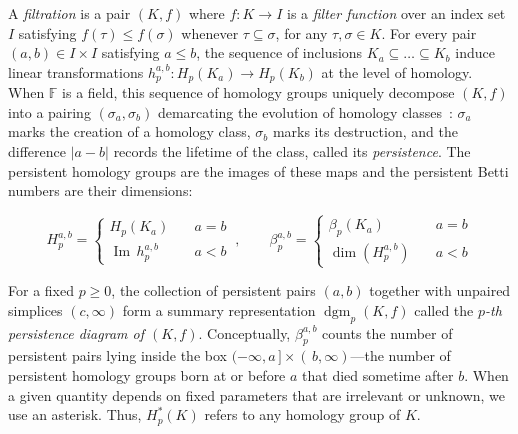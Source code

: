 \documentclass[pdflatex,sn-mathphys-num]{sn-jnl}
\begin{document}
A \emph{filtration} is a pair \((K,f)\) where \(f:K \rightarrow I\) is a \emph{filter function} over an index set \(I\) satisfying \(f(\tau) \leq f(\sigma)\) whenever \(\tau \subseteq \sigma\), for any \(\tau,\sigma \in K\). For every pair \((a,b) \in I \times I\) satisfying \(a \leq b\), the sequence of inclusions \(K_{a} \subseteq \ldots \subseteq K_{b}\) induce linear transformations \(h_{p}^{a,b}:H_{p}\left( K_{a} \right) \rightarrow H_{p}\left( K_{b} \right)\) at the level of homology. When \(\mathbb{F}\) is a field, this sequence of homology groups uniquely decompose \((K,f)\) into a pairing \(\left( \sigma_{a},\sigma_{b} \right)\) demarcating the evolution of homology classes~\cite{zomorodian2004computing}: \(\sigma_{a}\) marks the creation of a homology class, \(\sigma_{b}\) marks its destruction, and the difference \(\left| {a - b} \right|\) records the lifetime of the class, called its \emph{persistence}. The persistent homology groups are the images of these maps and the persistent Betti numbers are their dimensions:

\[H_{p}^{a,b} = \begin{cases}
H_{p}\left( K_{a} \right) & \quad a = b \\
\operatorname{Im}\, h_{p}^{a,b} & \quad a < b
\end{cases}\:,\quad\quad\beta_{p}^{a,b} = \begin{cases}
\beta_{p}\left( K_{a} \right) & \quad a = b \\
\dim \left( H_{p}^{a,b} \right)  & \quad a < b
\end{cases}\]\protect{}\label{eq:pers_homology}{}

For a fixed \(p \geq 0\), the collection of persistent pairs \((a,b)\) together with unpaired simplices \((c,\infty)\) form a summary representation \(\operatorname{dgm}_{p}(K,f)\) called the \emph{\(p\)-th persistence diagram of \((K,f)\)}. Conceptually, \(\beta_{p}^{a,b}\) counts the number of persistent pairs lying inside the box \(( - \infty,a\,] \times (\, b,\infty)\)---the number of persistent homology groups born at or before \(a\) that died sometime after \(b\). When a given quantity depends on fixed parameters that are irrelevant or unknown, we use an asterisk. Thus, \(H_{p}^{\ast}(K)\) refers to any homology group of \(K\).
\end{document}
